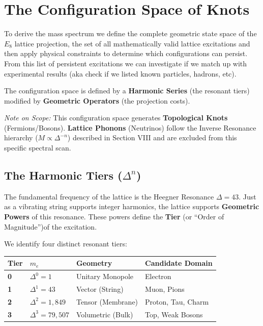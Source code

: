 \section*{The Configuration Space of Knots}

To derive the mass spectrum we define the complete geometric state space of the $E_8$ lattice projection, the set of all mathematically valid lattice excitations and then apply physical constraints to determine which configurations can persist. From this list of persistent excitations we can investigate if we match up with experimental results (aka check if we listed known particles, hadrons, etc).

The configuration space is defined by a \textbf{Harmonic Series} (the resonant tiers) modified by \textbf{Geometric Operators} (the projection costs).

\textit{Note on Scope:} This configuration space generates \textbf{Topological Knots} (Fermions/Bosons). \textbf{Lattice Phonons} (Neutrinos) follow the Inverse Resonance hierarchy ($M \propto \Delta^{-n}$) described in Section VIII and are excluded from this specific spectral scan.

\subsection*{The Harmonic Tiers (\texorpdfstring{$\Delta^n$}{Deltapown})}

The fundamental frequency of the lattice is the Heegner Resonance $\Delta = 43$. Just as a vibrating string supports integer harmonics, the lattice supports \textbf{Geometric Powers} of this resonance. These powers define the \textbf{Tier} (or ``Order of Magnitude'')of the excitation.

We identify four distinct resonant tiers:

\begin{table}[h]
\centering
\begin{tabular}{llll}
\toprule
\textbf{Tier} & \textbf{$m_e$} & \textbf{Geometry} & \textbf{Candidate Domain} \\ \midrule
\textbf{0} & $\Delta^0 = 1$ & Unitary Monopole & Electron \\
\textbf{1} & $\Delta^1 = 43$ & Vector (String) & Muon, Pions \\
\textbf{2} & $\Delta^2 = 1,849$ & Tensor (Membrane) & Proton, Tau, Charm \\
\textbf{3} & $\Delta^3 = 79,507$ & Volumetric (Bulk) & Top, Weak Bosons \\ \bottomrule
\end{tabular}
\end{table}

